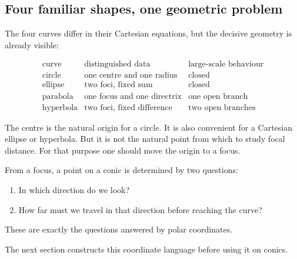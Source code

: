 \subsection{Four familiar shapes, one geometric problem}

The four curves differ in their Cartesian equations, but the decisive geometry
is already visible:

\[
\begin{array}{c|c|c}
\text{curve} & \text{distinguished data} & \text{large-scale behaviour}\\
\hline
\text{circle} & \text{one centre and one radius} & \text{closed}\\
\text{ellipse} & \text{two foci, fixed sum} & \text{closed}\\
\text{parabola} & \text{one focus and one directrix} & \text{one open branch}\\
\text{hyperbola} & \text{two foci, fixed difference} & \text{two open branches}
\end{array}
\]

The centre is the natural origin for a circle. It is also convenient for a
Cartesian ellipse or hyperbola. But it is not the natural point from which to
study focal distance. For that purpose one should move the origin to a focus.

\begin{corebox}
From a focus, a point on a conic is determined by two questions:
\begin{enumerate}
    \item In which direction do we look?
    \item How far must we travel in that direction before reaching the curve?
\end{enumerate}
These are exactly the questions answered by polar coordinates.
\end{corebox}

\begin{center}
\end{center}

The next section constructs this coordinate language before using it on conics.
